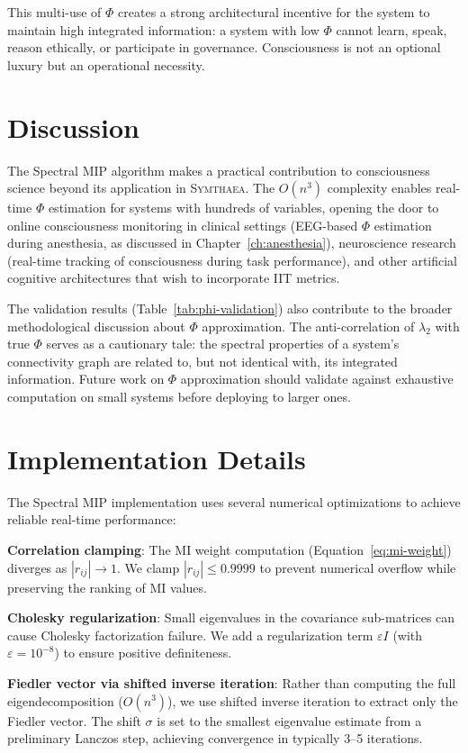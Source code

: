 \documentclass[12pt]{book}
\newcommand{\symthaea}{\textsc{Symthaea}}
\begin{document}
This multi-use of $\Phi$ creates a strong architectural incentive for the system to maintain high integrated information: a system with low $\Phi$ cannot learn, speak, reason ethically, or participate in governance. Consciousness is not an optional luxury but an operational necessity.

\section{Discussion}

The Spectral MIP algorithm makes a practical contribution to consciousness science beyond its application in \symthaea{}. The $O(n^3)$ complexity enables real-time $\Phi$ estimation for systems with hundreds of variables, opening the door to online consciousness monitoring in clinical settings (EEG-based $\Phi$ estimation during anesthesia, as discussed in Chapter~\ref{ch:anesthesia}), neuroscience research (real-time tracking of consciousness during task performance), and other artificial cognitive architectures that wish to incorporate IIT metrics.

The validation results (Table~\ref{tab:phi-validation}) also contribute to the broader methodological discussion about $\Phi$ approximation. The anti-correlation of $\lambda_2$ with true $\Phi$ serves as a cautionary tale: the spectral properties of a system's connectivity graph are related to, but not identical with, its integrated information. Future work on $\Phi$ approximation should validate against exhaustive computation on small systems before deploying to larger ones.

\section{Implementation Details}

The Spectral MIP implementation uses several numerical optimizations to achieve reliable real-time performance:

\textbf{Correlation clamping}: The MI weight computation (Equation~\ref{eq:mi-weight}) diverges as $|r_{ij}| \to 1$. We clamp $|r_{ij}| \leq 0.9999$ to prevent numerical overflow while preserving the ranking of MI values.

\textbf{Cholesky regularization}: Small eigenvalues in the covariance sub-matrices can cause Cholesky factorization failure. We add a regularization term $\varepsilon I$ (with $\varepsilon = 10^{-8}$) to ensure positive definiteness.

\textbf{Fiedler vector via shifted inverse iteration}: Rather than computing the full eigendecomposition ($O(n^3)$), we use shifted inverse iteration to extract only the Fiedler vector. The shift $\sigma$ is set to the smallest eigenvalue estimate from a preliminary Lanczos step, achieving convergence in typically 3--5 iterations.
\end{document}
